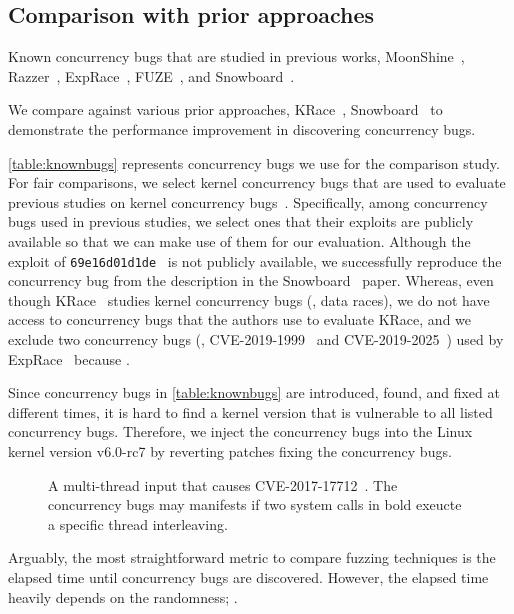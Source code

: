 \subsection{Comparison with prior approaches}
\label{ss:comparison}

\begin{table}[t]
  
  \centering
  \caption{Known concurrency bugs that are studied in previous works,
    MoonShine~\cite{moonshine}, Razzer~\cite{razzer},
    ExpRace~\cite{exprace}, FUZE~\cite{fuze}, and
    Snowboard~\cite{snowboard}.}
  \label{table:knownbugs}
\end{table}

We compare \sys against various prior approaches, KRace~\cite{krace},
Snowboard~\cite{snowboard} to demonstrate the performance improvement
in discovering concurrency bugs.

%
\autoref{table:knownbugs} represents concurrency bugs we use for the
comparison study.
%
For fair comparisons, we select kernel concurrency bugs that are used
to evaluate previous studies on kernel concurrency bugs~\cite{exprace,
  razzer, snowboard, moonshine, fuze}.
%
Specifically, among concurrency bugs used in previous studies, we
select ones that their exploits are publicly available so that we can
make use of them for our evaluation.
%
Although the exploit of \texttt{69e16d01d1de}~\cite{snowboardbug} is
not publicly available, we successfully reproduce the concurrency bug
from the description in the Snowboard~\cite{snowboard} paper.
%
Whereas, even though KRace~\cite{krace} studies kernel concurrency
bugs (\ie, data races), we do not have access to concurrency bugs that
the authors use to evaluate KRace, and we exclude two concurrency bugs
(\ie, CVE-2019-1999~\cite{cve20191999} and
CVE-2019-2025~\cite{cve20192025}) used by ExpRace~\cite{exprace}
because .



%
Since concurrency bugs in \autoref{table:knownbugs} are introduced,
found, and fixed at different times, it is hard to find a kernel
version that is vulnerable to all listed concurrency bugs.
%
Therefore, we inject the concurrency bugs into the Linux kernel
version v6.0-rc7 by reverting patches fixing the concurrency bugs.




%
\begin{figure}[t]
  \caption{A multi-thread input that causes
    CVE-2017-17712~\cite{cve201717712}. The concurrency bugs may
    manifests if two system calls in bold exeucte a specific thread
    interleaving.}
  \label{fig:multithreadinput}
\end{figure}
%
Arguably, the most straightforward metric to compare fuzzing
techniques is the elapsed time until concurrency bugs are discovered.
%
However, the elapsed time heavily depends on the randomness;
.

